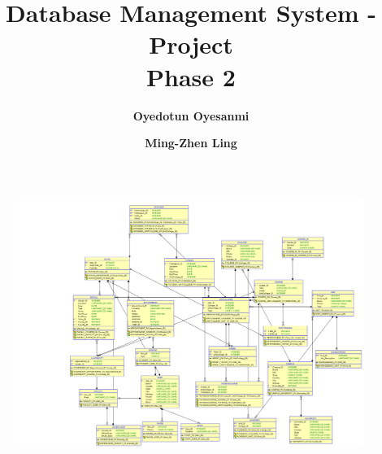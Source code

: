 \documentclass[titlepage]{article}
\author{
	\textbf{Oyedotun Oyesanmi } 
	\and 
	\textbf{Ming-Zhen Ling}}
\title{Database Management System - Project\\Phase 2}
\begin{document}
\maketitle
\pagebreak

\begin{figure}[ht]	
	\includegraphics[trim=10cm 0cm 0cm 0cm, clip=false, totalheight=0.76\textheight, angle=90]{Phase2.png} 
\end{figure}

\pagebreak


\end{document}
